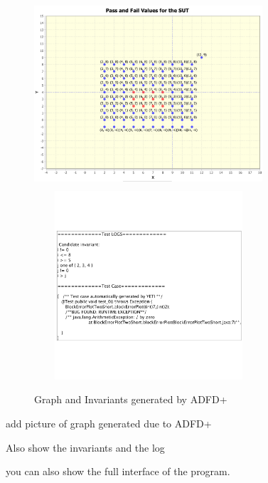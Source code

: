 \documentclass[conference]{IEEEtran}
\begin{document}
\begin{figure}[ht]
\centering
\includegraphics[width= 8.5cm,height=7cm]{adfdPlusGraph.png}
\includegraphics[width= 8.5cm,height=7cm]{adfdPlusInvariants.png}
\caption{Graph and Invariants generated by ADFD+}
\label{fig:ADFD+}
\end{figure}


add picture of graph generated due to ADFD+

Also show the invariants and the log

you can also show the full interface of the program.
\end{document}
